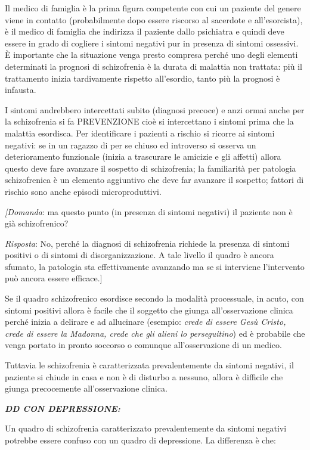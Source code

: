 \documentclass[]{article}
\begin{document}
Il medico di famiglia è la prima figura competente con cui un paziente
del genere viene in contatto (probabilmente dopo essere riscorso al
sacerdote e all'esorcista), è il medico di famiglia che indirizza il
paziente dallo psichiatra e quindi deve essere in grado di cogliere i
sintomi negativi pur in presenza di sintomi ossessivi. È importante che
la situazione venga presto compresa perché uno degli elementi
determinati la prognosi di schizofrenia è la durata di malattia non
trattata: più il trattamento inizia tardivamente rispetto all'esordio,
tanto più la prognosi è infausta.

I sintomi andrebbero intercettati subito (diagnosi precoce) e anzi ormai
anche per la schizofrenia si fa PREVENZIONE cioè si intercettano i
sintomi prima che la malattia esordisca. Per identificare i pazienti a
rischio si ricorre ai sintomi negativi: se in un ragazzo di per se
chiuso ed introverso si osserva un deterioramento funzionale (inizia a
trascurare le amicizie e gli affetti) allora questo deve fare avanzare
il sospetto di schizofrenia; la familiarità per patologia schizofrenica
è un elemento aggiuntivo che deve far avanzare il sospetto; fattori di
rischio sono anche episodi microproduttivi.

\emph{{[}Domanda}: ma questo punto (in presenza di sintomi negativi) il
paziente non è già schizofrenico?

\emph{Risposta}: No, perché la diagnosi di schizofrenia richiede la
presenza di sintomi positivi o di sintomi di disorganizzazione. A tale
livello il quadro è ancora sfumato, la patologia sta effettivamente
avanzando ma se si interviene l'intervento può ancora essere
efficace.{]}

Se il quadro schizofrenico esordisce secondo la modalità processuale, in
acuto, con sintomi positivi allora è facile che il soggetto che giunga
all'osservazione clinica perché inizia a delirare e ad allucinare
(esempio: \emph{crede di essere Gesù Cristo, crede di essere la Madonna,
crede che gli alieni lo perseguitino}) ed è probabile che venga portato
in pronto soccorso o comunque all'osservazione di un medico.

Tuttavia le schizofrenia è caratterizzata prevalentemente da sintomi
negativi, il paziente si chiude in casa e non è di disturbo a nessuno,
allora è difficile che giunga precocemente all'osservazione clinica.

\textbf{\emph{DD CON DEPRESSIONE:}}

Un quadro di schizofrenia caratterizzato prevalentemente da sintomi
negativi potrebbe essere confuso con un quadro di depressione. La
differenza è che:
\end{document}
